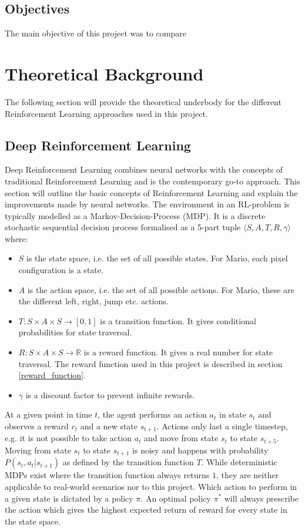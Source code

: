 \documentclass[notitlepage,a4paper,11pt]{article}
\newcommand{\R}{\mathbb{R}}
\begin{document}
\subsection{Objectives}
The main objective of this project was to compare 

\section{Theoretical Background}
The following section will provide the theoretical underbody for the different Reinforcement Learning approaches used in this project. 


\subsection{Deep Reinforcement Learning}\label{deep_rl}
Deep Reinforcement Learning combines neural networks with the concepts of traditional Reinforcement Learning and is the contemporary go-to approach. This section will outline the basic concepts of Reinforcement Learning and explain the improvements made by neural networks. The environment in an RL-problem is typically modelled as a Markov-Decision-Process (MDP). It is a discrete stochastic sequential decision process \cite{puterman2014markov} formalised as a 5-part tuple $\langle S, A, T, R, \gamma \rangle$ where:

\begin{itemize}[noitemsep]
	\item $S$ is the state space, i.e. the set of all possible states. For Mario, each pixel configuration is a state.
	\item $A$ is the action space, i.e. the set of all possible actions. For Mario, these are the different left, right, jump etc. actions.
	\item $T : S \times A \times S \to [0,1]$ is a transition function. It gives conditional probabilities for state traversal.
	\item $R : S \times A \times S \to \R$ is a reward function. It gives a real number for state traversal. The reward function used in this project is described in section \ref{reward_function}.
	\item $\gamma$ is a discount factor to prevent infinite rewards.
\end{itemize}

At a given point in time $t$, the agent performs an action $a_t$ in state $s_t$ and observes a reward $r_t$ and a new state $s_{t+1}$. Actions only last a single timestep, e.g. it is not possible to take action $a_t$ and move from state $s_t$ to state $s_{t+5}$. Moving from state $s_t$ to state $s_{t+1}$ is noisy and happens with probability $P(s_t, a_t | s_{t+1})$ as defined by the transition function $T$. While deterministic MDPs exist where the transition function always returns $1$, they are neither applicable to real-world scenarios nor to this project. Which action to perform in a given state is dictated by a policy $\pi$. An optimal policy $\pi^*$ will always prescribe the action which gives the highest expected return of reward for every state in the state space.
\end{document}

